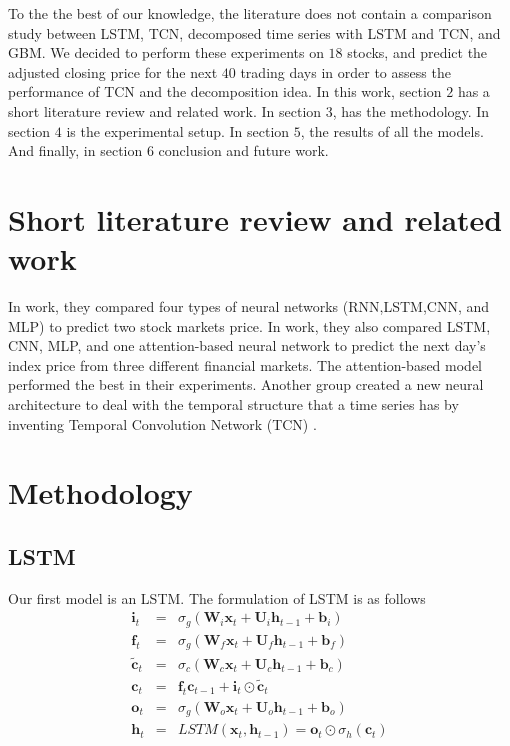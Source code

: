 \documentclass[12pt, A4]{article}
\begin{document}
To the the best of our knowledge, the literature does not contain a comparison study between LSTM, TCN, decomposed time series with LSTM and TCN, and GBM. We decided to perform these experiments on $18$ stocks, and predict the adjusted closing price for the next $40$ trading days in order to assess the performance of TCN and the decomposition idea. In this work, section $2$ has a short literature review and related work. In section $3$, has the methodology. In section $4$ is the experimental setup. In section $5$, the results of all the models. And finally, in section $6$ conclusion and future work.

\section{Short literature review and related work}

In \cite{hiransha2018nse} work, they compared four types of neural networks (RNN,LSTM,CNN, and MLP) to predict two stock markets price. In \cite{gao2020application} work, they also compared LSTM, CNN, MLP, and one attention-based neural network to predict the next day's index price from three different financial markets. The attention-based model performed the best in their experiments. Another group created a new neural architecture to deal with the temporal structure that a time series has by inventing Temporal Convolution Network (TCN)  \cite{lea2017temporal}. 

\section{Methodology}
\subsection{LSTM}
Our first model is an LSTM. The formulation of LSTM is as follows
\begin{eqnarray}
	\mathbf{i}_{t} &=& \sigma_{g}( \mathbf{W}_{i}\mathbf{x}_{t} + \mathbf{U}_{i}\mathbf{h}_{t-1} + \mathbf{b}_{i} ) \\
	\mathbf{f}_{t} &=& \sigma_{g}( \mathbf{W}_{f}\mathbf{x}_{t} + \mathbf{U}_{f}\mathbf{h}_{t-1} + \mathbf{b}_{f}  ) \\
	\tilde{\mathbf{c}}_{t} &=& \sigma_{c}( \mathbf{W}_{c}\mathbf{x}_{t} + \mathbf{U}_{c}\mathbf{h}_{t-1} + \mathbf{b}_{c}  ) \\
	\mathbf{c}_{t} &=& \mathbf{f}_{t}\mathbf{c}_{t-1} + \mathbf{i}_{t} \odot \tilde{\mathbf{c}}_{t} \\
	\mathbf{o}_{t} &=& \sigma_{g}(\mathbf{W}_{o}\mathbf{x}_{t} + \mathbf{U}_{o}\mathbf{h}_{t-1} + \mathbf{b}_{o} ) \\
	\mathbf{h}_{t} &=& LSTM(\mathbf{x}_{t}, \mathbf{h}_{t-1}) = \mathbf{o}_{t} \odot \sigma_{h}(\mathbf{c}_{t})
\end{eqnarray}
\end{document}

